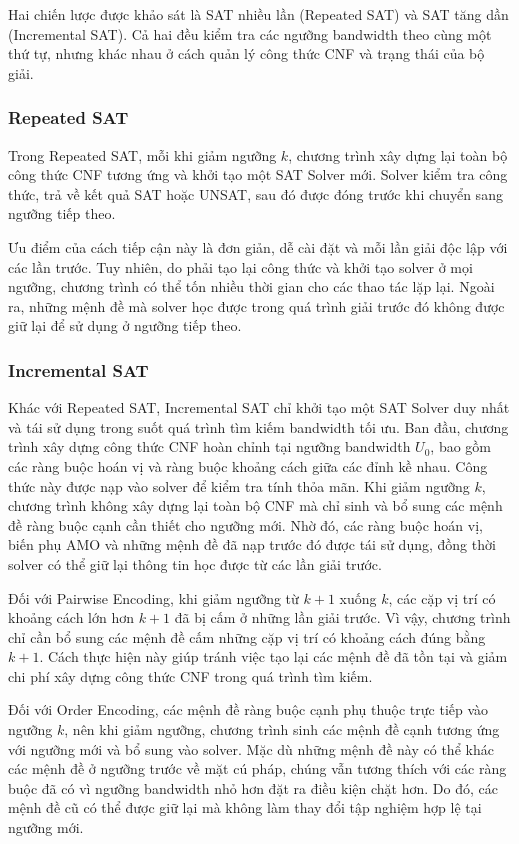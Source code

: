 \documentclass[a4paper,fleqn]{cas-sc}
\begin{document}
Hai chiến lược được khảo sát là SAT nhiều lần (Repeated SAT) và SAT tăng dần (Incremental SAT). Cả hai đều kiểm tra các ngưỡng bandwidth theo cùng một thứ tự, nhưng khác nhau ở cách quản lý công thức CNF và trạng thái của bộ giải.

\subsubsection{Repeated SAT}

Trong Repeated SAT, mỗi khi giảm ngưỡng $k$, chương trình xây dựng lại toàn bộ công thức CNF tương ứng và khởi tạo một SAT Solver mới. Solver kiểm tra công thức, trả về kết quả SAT hoặc UNSAT, sau đó được đóng trước khi chuyển sang ngưỡng tiếp theo.

Ưu điểm của cách tiếp cận này là đơn giản, dễ cài đặt và mỗi lần giải độc lập với các lần trước. Tuy nhiên, do phải tạo lại công thức và khởi tạo solver ở mọi ngưỡng, chương trình có thể tốn nhiều thời gian cho các thao tác lặp lại. Ngoài ra, những mệnh đề mà solver học được trong quá trình giải trước đó không được giữ lại để sử dụng ở ngưỡng tiếp theo.


\subsubsection{Incremental SAT}

Khác với Repeated SAT, Incremental SAT chỉ khởi tạo một SAT Solver duy nhất và tái sử dụng trong suốt quá trình tìm kiếm bandwidth tối ưu. Ban đầu, chương trình xây dựng công thức CNF hoàn chỉnh tại ngưỡng bandwidth $U_0$, bao gồm các ràng buộc hoán vị và ràng buộc khoảng cách giữa các đỉnh kề nhau. Công thức này được nạp vào solver để kiểm tra tính thỏa mãn. Khi giảm ngưỡng $k$, chương trình không xây dựng lại toàn bộ CNF mà chỉ sinh và bổ sung các mệnh đề ràng buộc cạnh cần thiết cho ngưỡng mới. Nhờ đó, các ràng buộc hoán vị, biến phụ AMO và những mệnh đề đã nạp trước đó được tái sử dụng, đồng thời solver có thể giữ lại thông tin học được từ các lần giải trước.

Đối với Pairwise Encoding, khi giảm ngưỡng từ $k+1$ xuống $k$, các cặp vị trí có khoảng cách lớn hơn $k+1$ đã bị cấm ở những lần giải trước. Vì vậy, chương trình chỉ cần bổ sung các mệnh đề cấm những cặp vị trí có khoảng cách đúng bằng $k+1$. Cách thực hiện này giúp tránh việc tạo lại các mệnh đề đã tồn tại và giảm chi phí xây dựng công thức CNF trong quá trình tìm kiếm.

Đối với Order Encoding, các mệnh đề ràng buộc cạnh phụ thuộc trực tiếp vào ngưỡng $k$, nên khi giảm ngưỡng, chương trình sinh các mệnh đề cạnh tương ứng với ngưỡng mới và bổ sung vào solver. Mặc dù những mệnh đề này có thể khác các mệnh đề ở ngưỡng trước về mặt cú pháp, chúng vẫn tương thích với các ràng buộc đã có vì ngưỡng bandwidth nhỏ hơn đặt ra điều kiện chặt hơn. Do đó, các mệnh đề cũ có thể được giữ lại mà không làm thay đổi tập nghiệm hợp lệ tại ngưỡng mới.
\end{document}
